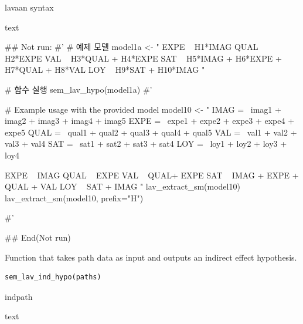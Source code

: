 \documentclass[a4paper]{book}
\begin{document}
%
\begin{Arguments}
\begin{ldescription}
\item[\code{model}] lavaan syntax
\end{ldescription}
\end{Arguments}
%
\begin{Value}
text
\end{Value}
%
\begin{Examples}
\begin{ExampleCode}

\#\# Not run: 
#'
# 예제 모델
model1a <- "
EXPE ~ H1*IMAG
QUAL ~ H2*EXPE
VAL ~  H3*QUAL + H4*EXPE
SAT ~ H5*IMAG + H6*EXPE + H7*QUAL + H8*VAL
LOY ~ H9*SAT + H10*IMAG
"

# 함수 실행
sem_lav_hypo(model1a)
#'

# Example usage with the provided model
model10 <- "
IMAG =~ imag1 + imag2 + imag3 + imag4 + imag5
EXPE =~ expe1 + expe2 + expe3 + expe4 + expe5
QUAL =~ qual1 + qual2 + qual3 + qual4 + qual5
VAL =~ val1 + val2 + val3 + val4
SAT =~ sat1 + sat2 + sat3 + sat4
LOY =~ loy1 + loy2 + loy3 + loy4

EXPE ~ IMAG
QUAL ~ EXPE
VAL ~  QUAL+ EXPE
SAT ~ IMAG + EXPE + QUAL + VAL
LOY ~ SAT + IMAG
"
lav_extract_sm(model10)%
lav_extract_sm(model10, prefix="H")%



#'

## End(Not run)

\end{ExampleCode}
\end{Examples}
%
\begin{Description}
Function that takes path data as input and outputs an indirect effect hypothesis.
\end{Description}
%
\begin{Usage}
\begin{verbatim}
sem_lav_ind_hypo(paths)
\end{verbatim}
\end{Usage}
%
\begin{Arguments}
\begin{ldescription}
\item[\code{paths}] indpath
\end{ldescription}
\end{Arguments}
%
\begin{Value}
text
\end{Value}
\end{document}
